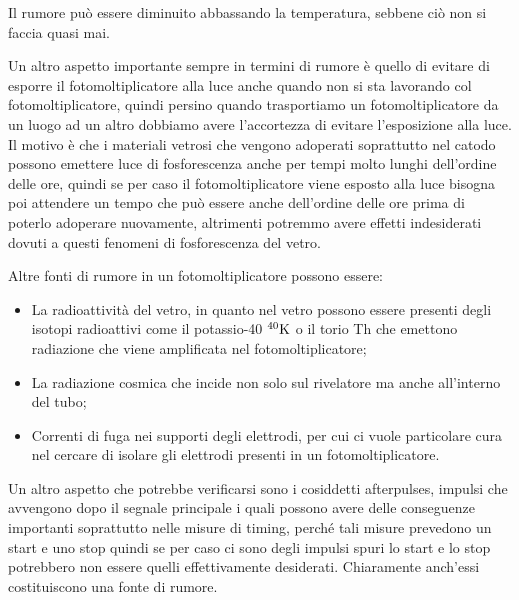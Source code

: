 Il rumore può essere diminuito abbassando la temperatura, sebbene ciò non si faccia quasi mai.

Un altro aspetto importante sempre in termini di rumore è quello di evitare di esporre il fotomoltiplicatore alla luce anche quando non si sta lavorando col fotomoltiplicatore, quindi persino quando trasportiamo un fotomoltiplicatore da un luogo ad un altro dobbiamo avere l'accortezza di evitare l'esposizione alla luce. Il motivo è che i materiali vetrosi che vengono adoperati soprattutto nel catodo possono emettere luce di fosforescenza anche per tempi molto lunghi dell'ordine delle ore, quindi se per caso il fotomoltiplicatore viene esposto alla luce bisogna poi attendere un tempo che può essere anche dell'ordine delle ore prima di poterlo adoperare nuovamente, altrimenti potremmo avere effetti indesiderati dovuti a questi fenomeni di fosforescenza del vetro. 

Altre fonti di rumore in un fotomoltiplicatore possono essere:

\begin{itemize}[leftmargin=0.5cm]
   \item La radioattività del vetro, in quanto nel vetro possono essere presenti degli isotopi radioattivi come il potassio-40 $\rm ^{40}K$ o il torio Th che emettono radiazione che viene amplificata nel fotomoltiplicatore;
   \item La radiazione cosmica che incide non solo sul rivelatore ma anche all'interno del tubo;
   \item Correnti di fuga nei supporti degli elettrodi, per cui ci vuole particolare cura nel cercare di isolare gli elettrodi presenti in un fotomoltiplicatore.
\end{itemize}

Un altro aspetto che potrebbe verificarsi sono i cosiddetti afterpulses, impulsi che avvengono dopo il segnale principale i quali possono avere delle conseguenze importanti soprattutto nelle misure di timing, perché tali misure prevedono un start e uno stop quindi se per caso ci sono degli impulsi spuri lo start e lo stop potrebbero non essere quelli effettivamente desiderati. Chiaramente anch'essi costituiscono una fonte di rumore.

